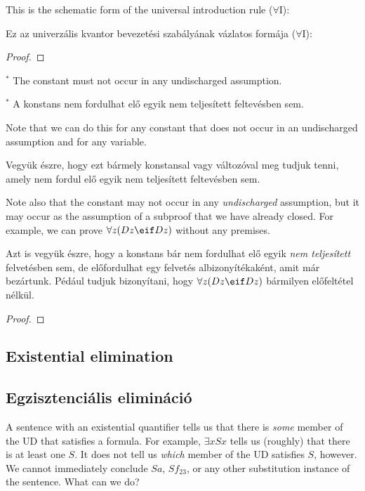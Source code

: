 This is the schematic form of the universal introduction rule ($\forall$I):

Ez az univerzális kvantor bevezetési szabályának vázlatos formája ($\forall$I):

\begin{proof}
	 
\end{proof}
$^\ast$ The constant  must not occur in any undischarged assumption.

$^\ast$ A  konstans nem fordulhat elő egyik nem teljesített feltevésben sem.

Note that we can do this for any constant that does not occur in an undischarged assumption and for any variable.

Vegyük észre, hogy ezt bármely konstansal vagy változóval meg tudjuk tenni, amely nem fordul elő egyik nem teljesített feltevésben sem.

Note also that the constant may not occur in any \emph{undischarged} assumption, but it may occur as the assumption of a subproof that we have already closed. For example, we can prove $\forall z(Dz \eif Dz)$ without any premises.

Azt is vegyük észre, hogy a konstans bár nem fordulhat elő egyik \emph{nem teljesített} felvetésben sem, de előfordulhat egy felvetés albizonyítékaként, amit már bezártunk. Pédául tudjuk bizonyítani, hogy  $\forall z(Dz \eif Dz)$ bármilyen előfeltétel nélkül.

\begin{proof}
	\open
	\close
\end{proof}


\subsection*{Existential elimination}
\subsection{Egzisztenciális elimináció}
A sentence with an existential quantifier tells us that there is \emph{some} member of the UD that satisfies a formula. For example, $\exists x Sx$ tells us (roughly) that there is at least one $S$. It does not tell us \emph{which} member of the UD satisfies $S$, however. We cannot immediately conclude $Sa$, $Sf_{23}$, or any other substitution instance of the sentence. What can we do?

